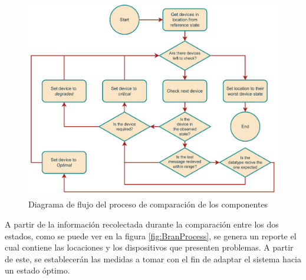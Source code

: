 \begin{figure}[ht]
    \centering
    \caption{Diagrama de flujo del proceso de comparación de los componentes}
    \label{fig:BranCompare}
    \includegraphics[width=\linewidth]{images/BranCompare.pdf}
\end{figure}

A partir de la información recolectada durante la comparación entre los dos estados, como se puede ver en la figura \ref{fig:BranProcess}, se genera un reporte el cual contiene las locaciones y los dispositivos que presenten problemas. A partir de este, se establecerán las medidas a tomar con el fin de adaptar el sistema hacia un estado óptimo.

